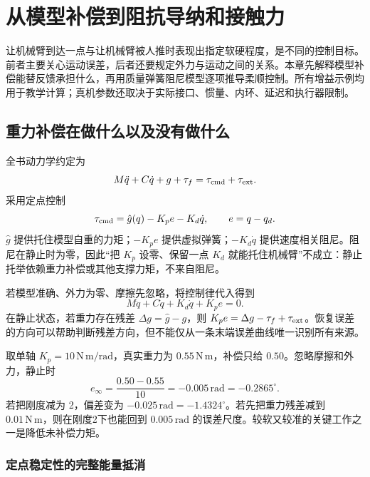 \chapter{从模型补偿到阻抗导纳和接触力}
\label{ch:impedance}

让机械臂到达一点与让机械臂被人推时表现出指定软硬程度，是不同的控制目标。前者主要关心运动误差，后者还要规定外力与运动之间的关系。本章先解释模型补偿能替反馈承担什么，再用质量弹簧阻尼模型逐项推导柔顺控制。所有增益示例均用于教学计算；真机参数还取决于实际接口、惯量、内环、延迟和执行器限制。

\section{重力补偿在做什么以及没有做什么}

全书动力学约定为
\begin{equation}
M\ddot q+C\dot q+g+\tau_f=\tau_{\rm cmd}+\tau_{\rm ext}.
\label{eq:cf_full_dyn}
\end{equation}
采用定点控制
\begin{equation}
\tau_{\rm cmd}=\hat g(q)-K_pe-K_d\dot q,
\qquad e=q-q_d.
\label{eq:cf_gpd}
\end{equation}
$\hat g$ 提供托住模型自重的力矩；$-K_pe$ 提供虚拟弹簧；$-K_d\dot q$ 提供速度相关阻尼。阻尼在静止时为零，因此“把 $K_p$ 设零、保留一点 $K_d$ 就能托住机械臂”不成立：静止托举依赖重力补偿或其他支撑力矩，不来自阻尼。

若模型准确、外力为零、摩擦先忽略，将控制律代入得到
\[
M\ddot q+C\dot q+K_d\dot q+K_pe=0.
\]
在静止状态，若重力存在残差 $\Delta g=\hat g-g$，则 $K_pe=\Delta g-\tau_f+\tau_{\rm ext}$。恢复误差的方向可以帮助判断残差方向，但不能仅从一条末端误差曲线唯一识别所有来源。

\begin{examplebox}[算例 15A 一点重力误差怎样成为可见位置偏差]
取单轴 $K_p=10\,\mathrm{N\,m/rad}$，真实重力为 $0.55\,\mathrm{N\,m}$，补偿只给 $0.50$。忽略摩擦和外力，静止时
\[
e_\infty=\frac{0.50-0.55}{10}=-0.005\,\mathrm{rad}=-0.2865^\circ.
\]
若把刚度减为 2，偏差变为 $-0.025\,\mathrm{rad}=-1.4324^\circ$。若先把重力残差减到 $0.01\,\mathrm{N\,m}$，则在刚度2下也能回到 $0.005\,\mathrm{rad}$ 的误差尺度。较软又较准的关键工作之一是降低未补偿力矩。
\end{examplebox}

\subsection{定点稳定性的完整能量抵消}

